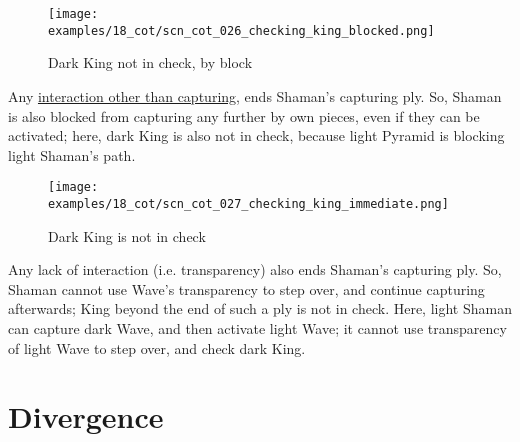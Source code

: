 \clearpage %

\vspace*{-2.1\baselineskip}
\noindent
\begin{figure}[!h]
\texttt{[image: examples/18\_cot/scn\_cot\_026\_checking\_king\_blocked.png]}
\vspace*{-1.5\baselineskip}
\caption{Dark King not in check, by block}
\label{fig:scn_cot_026_checking_king_blocked}
\end{figure}

\vspace*{-0.7\baselineskip}
Any
\hyperref[fig:scn_cot_005_light_shaman_capture_ply_passives]{interaction other than capturing},
ends Shaman's capturing ply. So, Shaman is also blocked from capturing any further
by own pieces, even if they can be activated; here, dark King is also not in check,
because light Pyramid is blocking light Shaman's path.

\vspace*{-1.1\baselineskip}
\noindent
\begin{figure}[!h]
\texttt{[image: examples/18\_cot/scn\_cot\_027\_checking\_king\_immediate.png]}
\vspace*{-1.5\baselineskip}
\caption{Dark King is not in check}
\label{fig:scn_cot_027_checking_king_immediate}
\end{figure}

\vspace*{-0.7\baselineskip}
Any lack of interaction (i.e. transparency) also ends Shaman's capturing ply.
So, Shaman cannot use Wave's transparency to step over, and continue capturing
afterwards; King beyond the end of such a ply is not in check.\newline
\indent
Here, light Shaman can capture dark Wave, and then activate light Wave; it cannot
use transparency of light Wave to step over, and check dark King.

\clearpage %

\section*{Divergence}
\label{sec:Conquest of Tlalocan/Divergence}

